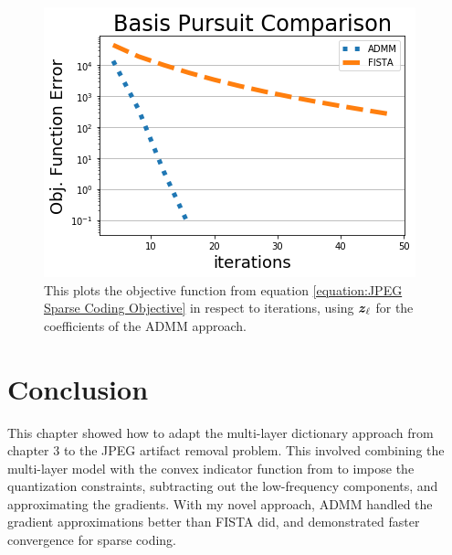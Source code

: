 \begin{figure}
    \centering
    \includegraphics[width=.75\textwidth]{figures/Sparse_Coding_Comparison.png}
    \caption{This plots the objective function from equation \ref{equation:JPEG Sparse Coding Objective} in respect to iterations, using $\bm{z}_{\ell}$ for the coefficients of the ADMM approach.}
    \label{figure:Sparse Coding Error}
\end{figure}
\section{Conclusion}
This chapter showed how to adapt the multi-layer dictionary approach from chapter $3$ to the JPEG artifact removal problem. This involved combining the multi-layer model with the convex indicator function from \cite{sorel2016efficient} to impose the quantization constraints, subtracting out the low-frequency components, and approximating the gradients.  With my novel approach, ADMM handled the gradient approximations better than FISTA did, and demonstrated faster convergence for sparse coding.
